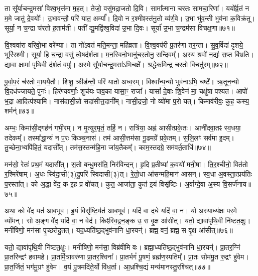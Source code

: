 ता सू᳚र्याचन्द्र॒मसा॑ विश्व॒भृत्त॑मा म॒हत्।
तेजो॒ वसु॑मद्राजतो दि॒वि।
सामा᳚त्माना चरतः सामचा॒रिणा᳚।
ययो᳚र्व्र॒तं न म॒मे जातु॑ दे॒वयोः᳚।
उ॒भावन्तौ॒ परि॑ यात॒ अर्म्या᳚।
दि॒वो न र॒श्मीꣴस्त॑नु॒तो व्य॑र्ण॒वे।
उ॒भा भु॑व॒न्ती भुव॑ना क॒विक्र॑तू।
सूर्या॒ न च॒न्द्रा च॑रतो ह॒ताम॑ती।
पती᳚ द्यु॒मद्वि॑श्व॒विदा॑ उ॒भा दि॒वः।
सूर्या॑ उ॒भा च॒न्द्रम॑सा विचक्ष॒णा॥७१॥

वि॒श्ववा॑रा वरिवो॒भा वरे᳚ण्या।
ता नो॑ऽवतं मति॒मन्ता॒ महि॑व्रता।
वि॒श्व॒वप॑री प्र॒तर॑णा तर॒न्ता।
सु॒व॒र्विदा॑ दृ॒शये॒ भूरि॑रश्मी।
सूर्या॒ हि च॒न्द्रा वसु॑ त्वे॒षद॑र्\mbox{}शता।
म॒न॒स्विनो॒भानु॑चर॒तोनु॒ सन्दिवम्᳚।
अ॒स्य श्रवो॑ न॒द्यः॑ स॒प्त बि॑भ्रति।
द्यावा॒ क्षामा॑ पृथि॒वी द॑र्\mbox{}श॒तं वपुः॑।
अ॒स्मे सू᳚र्याचन्द्र॒मसा॑\-ऽभि॒चक्षे᳚।
श्र॒द्धेकमि॑न्द्र चरतो विचर्तु॒रम्॥७२॥

पू॒र्वा॒प॒रं च॑रतो मा॒ययै॒तौ।
शिशू॒ क्रीड॑न्तौ॒ परि॑ यातो अध्व॒रम्।
विश्वा᳚न्य॒न्यो भुव॑नाऽभि॒ चष्टे᳚।
ऋ॒तून॒न्यो वि॒दध॑ज्जायते॒ पुनः॑।
हिर॑ण्यवर्णाः॒ शुच॑यः पाव॒का यासा॒ꣳ॒ राजा᳚।
यासां᳚ दे॒वाः शि॒वेन॑ मा॒ चक्षु॑षा पश्यत।
आपो॑ भ॒द्रा आदित्प॑श्यामि।
नास॑दासी॒न्नो सदा॑सीत्त॒दानी᳚म्।
नासी॒द्रजो॒ नो व्यो॑मा प॒रो यत्।
किमाव॑रीवः॒ कुह॒ कस्य॒ शर्मन्॑॥७३॥

अम्भः॒ किमा॑सी॒द्गह॑नं गभी॒रम्।
न मृ॒त्युर॒मृतं॒ तर्\mbox{}हि॒ न।
रात्रि॑या॒ अह्न॑ आसीत्प्रके॒तः।
आनी॑दवा॒तꣴ स्व॒धया॒ तदेकम्᳚।
तस्मा᳚द्धा॒न्यं न प॒रः किञ्च॒नास॑।
तम॑ आसी॒त्तम॑सा गू॒ढमग्रे᳚ प्रके॒तम्।
स॒लि॒लꣳ सर्व॑मा इ॒दम्।
तु॒च्छेना॒भ्वपि॑हितं॒ यदासी᳚त्।
तम॑स॒स्तन्म॑हि॒ना जा॑य॒तैकम्᳚।
काम॒स्तदग्रे॒ सम॑वर्त॒ताधि॑॥७४॥

मन॑सो॒ रेतः॑ प्रथ॒मं यदासी᳚त्।
स॒तो बन्धु॒मस॑ति॒ निर॑विन्दन्।
हृ॒दि प्र॒तीष्या॑ क॒वयो॑ मनी॒षा।
ति॒र॒श्चीनो॒ वित॑तो र॒श्मिरे॑षाम्।
अ॒धः स्वि॑दा॒सी(३)दु॒परि॑ स्विदासी(३)त्।
रे॒तो॒धा आ॑सन्महि॒मान॑ आसन्।
स्व॒धा अ॒वस्ता॒त्प्रय॑तिः प॒रस्ता᳚त्।
को अ॒द्धा वे॑द॒ क इ॒ह प्र वो॑चत्।
कुत॒ आजा॑ता॒ कुत॑ इ॒यं विसृ॑ष्टिः।
अ॒र्वाग्दे॒वा अ॒स्य वि॒सर्ज॑नाय॥७५॥

अथा॒ को वे॑द॒ यत॑ आब॒भूव॑।
इ॒यं विसृ॑ष्टि॒र्यत॑ आब॒भूव॑।
यदि॑ वा द॒धे यदि॑ वा॒ न।
यो अ॒स्याध्य॑क्षः पर॒मे व्यो॑मन्।
सो अ॒ङ्ग वे॑द॒ यदि॑ वा॒ न वेद॑।
किꣴस्वि॒द्वन॒ङ्क उ॒ स वृ॒क्ष आ॑सीत्।
यतो॒ द्यावा॑पृथि॒वी नि॑ष्टत॒क्षुः।
मनी॑षिणो॒ मन॑सा पृ॒च्छतेदु॒तत्।
यद॒ध्यति॑ष्ठ॒द्भुव॑नानि धा॒रयन्॑।
ब्रह्म॒ वनं॒ ब्रह्म॒ स वृ॒क्ष आ॑सीत्॥७६॥

यतो॒ द्यावा॑पृथि॒वी नि॑ष्टत॒क्षुः।
मनी॑षिणो॒ मन॑सा॒ विब्र॑वीमि वः।
ब्रह्मा॒ध्यति॑ष्ठ॒द्भुव॑नानि धा॒रयन्॑।
प्रा॒तर॒ग्निं प्रा॒तरिन्द्रꣳ॑ हवामहे।
प्रा॒तर्मि॒त्रावरु॑णा प्रा॒तर॒श्विना᳚।
प्रा॒तर्भगं॑ पू॒षणं॒ ब्रह्म॑ण॒स्पतिम्᳚।
प्रा॒तः सोम॑मु॒त रु॒द्रꣳ हु॑वेम।
प्रा॒त॒र्जितं॒ भग॑मु॒ग्रꣳ हु॑वेम।
व॒यं पु॒त्रमदि॑ते॒र्यो वि॑ध॒र्ता।
आ॒ध्रश्चि॒द्यं मन्य॑मानस्तु॒रश्चि॑त्॥७७॥

